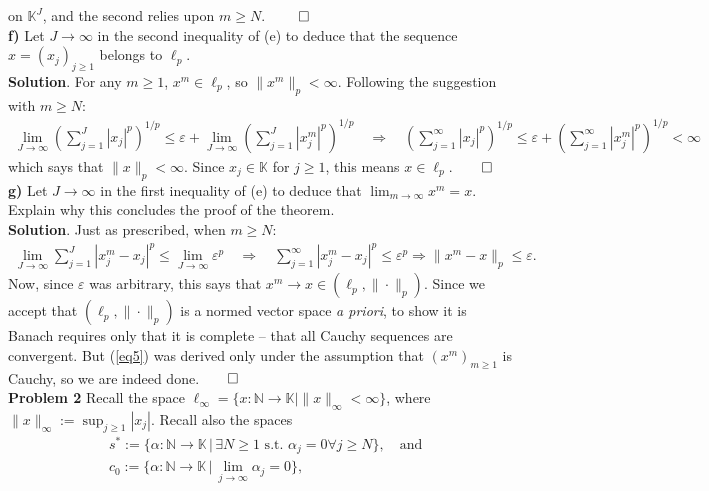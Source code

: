 \documentclass[10pt]{article}
\newcommand{\mbb}[1]{\mathbb{#1}}
\newcommand{\1}[1]{\mathbbm{1}_{#1}}
\begin{document}
    on $\mbb{K}^J$, and the second relies upon $m\geq N$. \hfill{$\qed$}\\[5pt]
    {\bf f)} Let $J\rightarrow\infty$ in the second inequality of (e) to deduce
    that the sequence $x=(x_j)_{j\geq 1}$ belongs to $\ell_p$.\\[5pt]
    {\bf Solution}. For any $m\geq 1$, $x^m\in\ell_p$, so $\|x^m\|_p<\infty$.
    Following the suggestion with $m\geq N$:
    \begin{align*}
        \lim_{J\rightarrow\infty}\left(\sum_{j=1}^J|x_j|^p\right)^{1/p}\leq\varepsilon+\lim_{J\rightarrow\infty}\left(\sum_{j=1}^J|x^m_j|^p\right)^{1/p}\quad\Rightarrow\quad \left(\sum_{j=1}^\infty|x_j|^p\right)^{1/p}\leq\varepsilon+\left(\sum_{j=1}^\infty|x_j^m|^p\right)^{1/p}<\infty
    \end{align*}
    which says that $\|x\|_p<\infty$. Since $x_j\in\mbb{K}$ for $j\geq 1$, this
    means $x\in\ell_p$.\hfill{$\qed$}\\[5pt]
    {\bf g)} Let $J\rightarrow\infty$ in the first inequality of (e) to deduce
    that $\lim_{m\rightarrow\infty}x^m=x$. Explain why this concludes the proof
    of the theorem.\\[5pt]
    {\bf Solution}. Just as prescribed, when $m\geq N$:
    \begin{align}
        \lim_{J\rightarrow\infty}\sum_{j=1}^J|x^m_j-x_j|^p\leq\lim_{J\rightarrow\infty}\varepsilon^p\quad\Rightarrow\quad\sum_{j=1}^\infty|x^m_j-x_j|^p\leq\varepsilon^p\Rightarrow\|x^m-x\|_p\leq\varepsilon.\label{eq5}
    \end{align}
    Now, since $\varepsilon$ was arbitrary, this says that $x^m\rightarrow
    x\in(\ell_p,\|\cdot\|_p)$. Since we accept that $(\ell_p,\|\cdot\|_p)$ is a
    normed vector space {\it a priori}, to show it is Banach requires only that
    it is complete -- that all Cauchy sequences are convergent. But (\ref{eq5})
    was derived only under the assumption that $(x^m)_{m\geq 1}$ is Cauchy, so
    we are indeed done.\hfill{$\qed$}\\[5pt]
    {\bf Problem 2} Recall the space
    $\ell_\infty=\{x:\mbb{N}\rightarrow\mbb{K}|\|x\|_\infty<\infty\}$, where
    $\|x\|_\infty:=\sup_{j\geq 1}|x_j|$. Recall also the spaces
    \begin{align}
        &s^\ast:=\{\alpha:\mbb{N}\rightarrow\mbb{K}\,|\,\exists N\geq 1 \text{ s.t. }\alpha_j=0\forall j\geq N\},\quad\text{and}\\
        &c_0:=\{\alpha:\mbb{N}\rightarrow\mbb{K}\,|\,\lim_{j\rightarrow\infty}\alpha_j=0\},
    \end{align}
\end{document}
